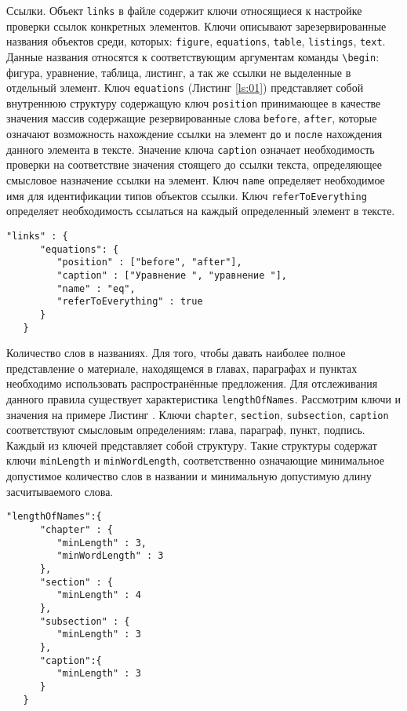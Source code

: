     Ссылки. Объект \verb|links| в файле содержит ключи относящиеся к настройке проверки ссылок конкретных элементов. Ключи описывают зарезервированные названия объектов среди, которых: \verb|figure|, \verb|equations|, \verb|table|, \verb|listings|, \verb|text|. Данные названия относятся к соответствующим аргументам команды \verb|\begin|: фигура, уравнение, таблица, листинг, а так же ссылки не выделенные в отдельный элемент. Ключ \verb|equations| (Листинг \ref{ls:01}) представляет собой внутреннюю структуру содержащую ключ \verb|position| принимающее в качестве значения массив содержащие резервированные слова \verb|before|, \verb|after|, которые означают возможность нахождение ссылки на элемент \verb|до| и \verb|после| нахождения данного элемента в тексте. Значение ключа \verb|caption| означает необходимость проверки на соответствие значения стоящего до ссылки текста, определяющее смысловое назначение ссылки на элемент. Ключ \verb|name| определяет необходимое имя для идентификации типов объектов ссылки. Ключ \verb|referToEverything| определяет необходимость ссылаться на каждый определенный элемент в тексте. 
    
    \begin{lstlisting}[caption = {Пример конфигурации ссылок}, label={ls:01}]
    "links" : {
      "equations": {
         "position" : ["before", "after"],  
         "caption" : ["Уравнение ", "уравнение "],
         "name" : "eq",
         "referToEverything" : true
      }
   }
    \end{lstlisting}

    Количество слов в названиях. Для того, чтобы давать наиболее полное представление о материале, находящемся в главах, параграфах и пунктах необходимо использовать распространённые предложения. Для отслеживания данного правила существует характеристика \verb|lengthOfNames|. Рассмотрим ключи и значения на примере Листинг . Ключи \verb|chapter|, \verb|section|, \verb|subsection|, \verb|caption| соответствуют смысловым определениям: глава, параграф, пункт, подпись. Каждый из ключей представляет собой структуру. Такие структуры содержат ключи \verb|minLength| и \verb|minWordLength|, соответственно означающие минимальное допустимое количество слов в названии и минимальную допустимую длину засчитываемого слова.  
    
     \begin{lstlisting}[caption = {Пример конфигурации названий}, label={ls:02}]
    "lengthOfNames":{
      "chapter" : {
         "minLength" : 3,
         "minWordLength" : 3
      },
      "section" : {
         "minLength" : 4
      },
      "subsection" : {
         "minLength" : 3
      },
      "caption":{
         "minLength" : 3
      }
   }
    \end{lstlisting}

